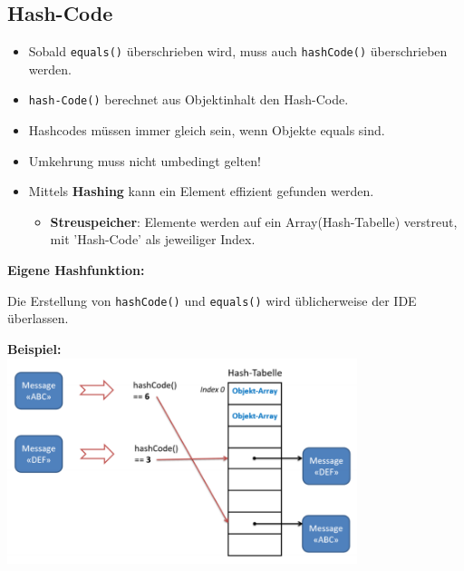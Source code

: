	\subsection*{Hash-Code}
		\begin{itemize}[noitemsep]
			\item Sobald \texttt{equals()} überschrieben wird, muss auch \texttt{hashCode()} überschrieben werden.
			\item \texttt{hash-Code()} berechnet aus Objektinhalt den Hash-Code.
			\item Hashcodes müssen immer gleich sein, wenn Objekte equals sind.
			\item Umkehrung muss nicht umbedingt gelten!
			\item Mittels \textbf{Hashing} kann ein Element effizient gefunden werden.\vspace*{-0.15cm}
			\begin{itemize}[noitemsep]
				\item \textbf{Streuspeicher}: Elemente werden auf ein Array(Hash-Tabelle) verstreut, mit 'Hash-Code' als jeweiliger Index.
			\end{itemize}
		\end{itemize}
		\begin{minipage}[t]{8cm}
			\textbf{Eigene Hashfunktion:}
			
			Die Erstellung von \texttt{hashCode()} und \texttt{equals()} wird üblicherweise der IDE überlassen.
		\end{minipage}
		\hspace*{0.5cm}
		\begin{minipage}[t]{9.3cm}
			\textbf{Beispiel:}\\
			\includegraphics[height=6cm, align=t]{pics/hashing.PNG}
		\end{minipage}
		